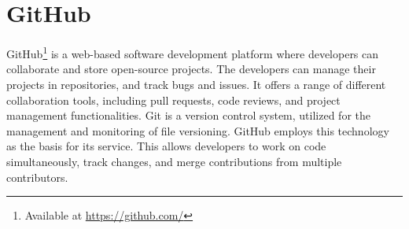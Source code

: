 \section{GitHub}
GitHub\footnote{Available at \url{https://github.com/}} is a web-based software development platform where developers can collaborate and store open-source projects. The developers can manage their projects in repositories, and track bugs and issues. It offers a range of different collaboration tools, including pull requests, code reviews, and project management functionalities. Git is a version control system, utilized for the management and monitoring of file versioning. GitHub employs this technology as the basis for its service. This allows developers to work on code simultaneously, track changes, and merge contributions from multiple contributors.\cite{github}
